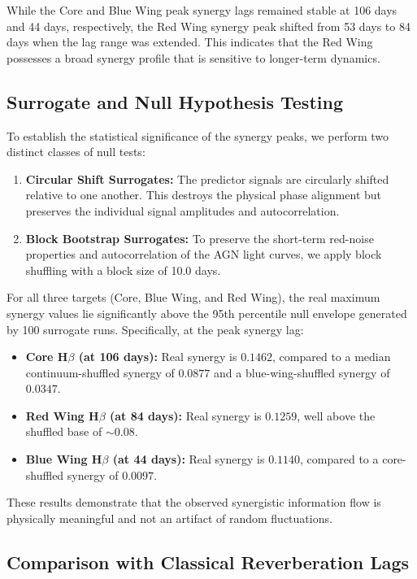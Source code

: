 \documentclass[12pt, a4paper]{article}
\begin{document}
While the Core and Blue Wing peak synergy lags remained stable at 106 days and 44 days, respectively, the Red Wing synergy peak shifted from 53 days to 84 days when the lag range was extended. This indicates that the Red Wing possesses a broad synergy profile that is sensitive to longer-term dynamics.

\subsection{Surrogate and Null Hypothesis Testing}

To establish the statistical significance of the synergy peaks, we perform two distinct classes of null tests:
\begin{enumerate}
    \item \textbf{Circular Shift Surrogates:} The predictor signals are circularly shifted relative to one another. This destroys the physical phase alignment but preserves the individual signal amplitudes and autocorrelation.
    \item \textbf{Block Bootstrap Surrogates:} To preserve the short-term red-noise properties and autocorrelation of the AGN light curves, we apply block shuffling with a block size of 10.0 days.
\end{enumerate}

For all three targets (Core, Blue Wing, and Red Wing), the real maximum synergy values lie significantly above the 95th percentile null envelope generated by 100 surrogate runs. Specifically, at the peak synergy lag:
\begin{itemize}
    \item \textbf{Core H\(\beta\) (at 106 days):} Real synergy is $0.1462$, compared to a median continuum-shuffled synergy of $0.0877$ and a blue-wing-shuffled synergy of $0.0347$.
    \item \textbf{Red Wing H\(\beta\) (at 84 days):} Real synergy is $0.1259$, well above the shuffled base of $\sim 0.08$.
    \item \textbf{Blue Wing H\(\beta\) (at 44 days):} Real synergy is $0.1140$, compared to a core-shuffled synergy of $0.0097$.
\end{itemize}
These results demonstrate that the observed synergistic information flow is physically meaningful and not an artifact of random fluctuations.

\subsection{Comparison with Classical Reverberation Lags}
\end{document}

